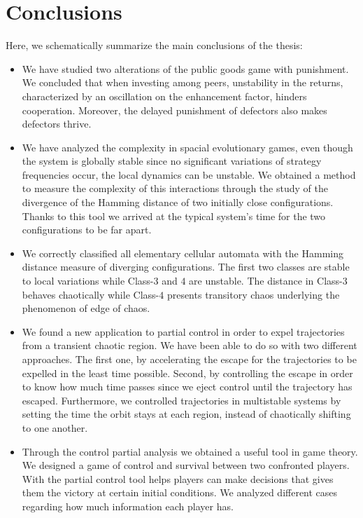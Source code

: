 \chapter{Conclusions}
\label{chap:Conclusion}

\vspace{-2cm}
Here, we schematically summarize the main conclusions of the thesis:

\begin{itemize}

\item We have studied two alterations of the public goods game with punishment. We concluded that when investing among peers, unstability in the returns, characterized by an oscillation on the enhancement factor, hinders cooperation. Moreover, the delayed punishment of defectors also makes defectors thrive.


\item We have analyzed the complexity in spacial evolutionary games, even though the system is globally stable since no significant variations of strategy frequencies occur, the local dynamics can be unstable. We obtained a method to measure the complexity of this interactions through the study of the divergence of the Hamming distance of two initially close configurations. Thanks to this tool we arrived at the typical system's time for the two configurations to be far apart.

\item We correctly classified all elementary cellular automata with the Hamming distance measure of diverging configurations. The first two classes are stable to local variations while Class-$3$ and $4$ are unstable. The distance in Class-$3$ behaves chaotically while Class-$4$ presents transitory chaos underlying the phenomenon of edge of chaos.

\item We found a new application to partial control in order to expel trajectories from a transient chaotic region. We have been able to do so with two different approaches. The first one, by accelerating the escape for the trajectories to be expelled in the least time possible. Second, by controlling the escape in order to know how much time passes since we eject control until the trajectory has escaped. Furthermore, we controlled trajectories in multistable systems by setting the time the orbit stays at each region, instead of chaotically shifting to one another.

\item Through the control partial analysis we obtained a useful tool in game theory. We designed a game of control and survival between two confronted players. With the partial control tool helps players can make decisions that gives them the victory at certain initial conditions. We analyzed different cases regarding how much information each player has.

\end{itemize}


